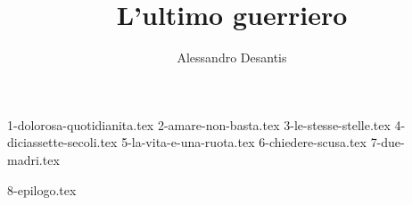 \documentclass[a4paper,oneside,11pt]{memoir}
\title{L'ultimo guerriero}
\author{Alessandro Desantis}
\date{}
\begin{document}
    \begin{titlingpage}
        \maketitle
    \end{titlingpage}


    {1-dolorosa-quotidianita.tex}
    {2-amare-non-basta.tex}
    {3-le-stesse-stelle.tex}
    {4-diciassette-secoli.tex}
    {5-la-vita-e-una-ruota.tex}
    {6-chiedere-scusa.tex}
    {7-due-madri.tex}

    \backmatter

    {8-epilogo.tex}
\end{document}
